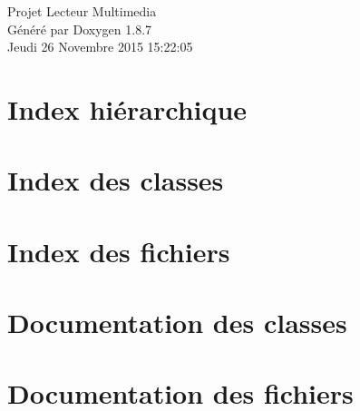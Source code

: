 \documentclass[twoside]{book}
\newcommand{\+}{\discretionary{\mbox{\scriptsize$\hookleftarrow$}}{}{}}
\newcommand{\clearemptydoublepage}{%
  \newpage{\pagestyle{empty}\cleardoublepage}%
}
\begin{document}
\hypersetup{pageanchor=false,
             bookmarks=true,
             bookmarksnumbered=true,
             pdfencoding=unicode
            }
\begin{titlepage}
\vspace*{7cm}
\begin{center}%
{\Large Projet Lecteur Multimedia }\\
\vspace*{1cm}
{\large Généré par Doxygen 1.8.7}\\
\vspace*{0.5cm}
{\small Jeudi 26 Novembre 2015 15:22:05}\\
\end{center}
\end{titlepage}
\clearemptydoublepage
\tableofcontents
\clearemptydoublepage
{}
\hypersetup{pageanchor=true}

\chapter{Index hiérarchique}

\chapter{Index des classes}

\chapter{Index des fichiers}

\chapter{Documentation des classes}



























\chapter{Documentation des fichiers}
























\newpage
{}
{}
\printindex
\end{document}
